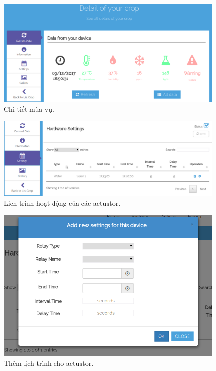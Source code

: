 \documentclass[a4paper,12pt,oneside]{article}
\begin{document}
\begin{center}
\begin{figure}[H]
\begin{center}
\includegraphics[scale=.4]{hinh/web_crop_detail.png}
\end{center}
\caption{Chi tiết mùa vụ.}
\end{figure}

\begin{figure}[H]
\begin{center}
\includegraphics[scale=.5]{hinh/web_schedule.png}
\end{center}
\caption{Lich trình hoạt động của các actuator.}
\end{figure}

\begin{figure}[H]
\begin{center}
\includegraphics[scale=.5]{hinh/web_add_schedule.png}
\end{center}
\caption{Thêm lịch trình cho actuator.}
\end{figure}


\end{center}
\end{document}
